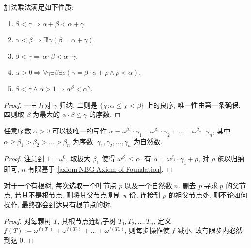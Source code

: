\begin{lemma}
    加法乘法满足如下性质:

    \begin{enumerate}
        \item \(\beta < \gamma \Rightarrow \alpha + \beta < \alpha + \gamma\).
        \item \(\alpha < \beta \Rightarrow \exists ! \gamma (\beta = \alpha + \gamma)\).
        \item \(\beta < \gamma \Rightarrow \alpha \cdot \beta < \alpha \cdot \gamma\).
        \item \(\alpha > 0 \Rightarrow \forall \gamma \exists \beta \exists \rho (\gamma = \beta \cdot \alpha + \rho \land \rho < \alpha)\).
        \item \(\beta < \gamma \land \alpha > 1 \Rightarrow \alpha^\beta < \alpha^\gamma\).
    \end{enumerate}

    \begin{proof}
        一三五对 \(\gamma\) 归纳, 二则是 \(\{\chi : \alpha \le \chi < \beta\}\) 上的良序, 唯一性由第一条确保.
        四则取 \(\beta\) 为最大的 \(\alpha \cdot \beta \le \gamma\) 的序数.
    \end{proof}
\end{lemma}

\begin{theorem*}
    [Cantor] 任意序数 \(\alpha > 0\) 可以被唯一的写作
    \(\alpha = \omega^{\beta_1} \cdot \gamma_1 + \omega^{\beta_2} \cdot \gamma_2 + \dots + \omega^{\beta_n} \cdot \gamma_n\),
    其中 \(\alpha \ge \beta_1 > \beta_2 > \dots > \beta_n\) 为序数, \(\gamma_1, \gamma_2, \dots, \gamma_n\) 为自然数.

    \begin{proof}
        注意到 \(1 = \omega^0\), 取极大 \(\beta_1\) 使得 \(\omega^{\beta_1} \le \alpha\), 有 \(\alpha = \omega^{\beta_1} \cdot \gamma_1 + \rho\),
        对 \(\rho\) 施以归纳即可, \(n\) 有限基于 \ref{axiom:NBG Axiom of Foundation}.
    \end{proof}
\end{theorem*}

\begin{example*}
    [Hydra 数] 对于一个有根树, 每次选取一个叶节点 \(p\) 以及一个自然数 \(n\).
    删去 \(p\) 寻求 \(p\) 的父节点, 若其不是根节点, 则将其父节点复制 \(n\) 份,
    连接到 \(p\) 的祖父节点处, 则不论如何操作, 最终都会到达只有根节点的树.

    \begin{proof}
        对每颗树 \(T\), 其根节点连结子树 \(T_1, T_2, \dots, T_n\), 定义 \(f(T) := \omega^{f(T_1)} + \omega^{f(T_2)} + \dots + \omega^{f(T_n)}\),
        则每步操作使 \(f\) 减小, 故有限步内必然到达 \(0\).
    \end{proof}
\end{example*}

